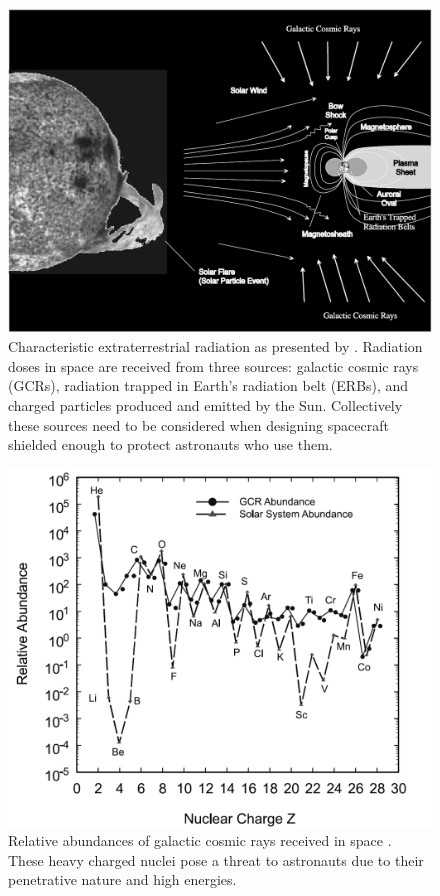 \begin{figure}
\centering
\includegraphics[scale=0.5]{space_radiation.png}
\caption{Characteristic extraterrestrial radiation as presented by \cite{bentonbenton}. Radiation doses in space are received from three sources: galactic cosmic rays (GCRs), radiation trapped in Earth’s radiation belt (ERBs), and charged particles produced and emitted by the Sun. Collectively these sources need to be considered when designing spacecraft shielded enough to protect astronauts who use them.}
\label{fig:space-radiation }
\end{figure}

\begin{figure}
\centering
\includegraphics[scale=0.5]{abundances}
\caption{Relative abundances of galactic cosmic rays received in space \cite{bentonbenton}. These heavy charged nuclei pose a threat to astronauts due to their penetrative nature and high energies.}
\label{fig:abundances }
\end{figure}

